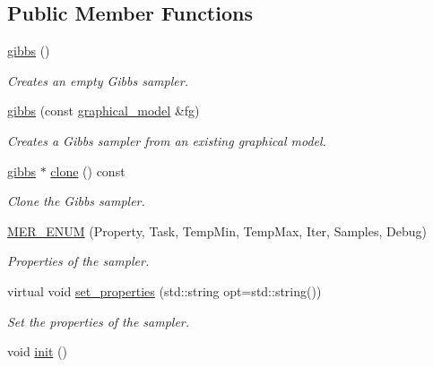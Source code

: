 \subsection*{Public Member Functions}
\begin{DoxyCompactItemize}
\item 
\hyperlink{classmerlin_1_1gibbs_a1513d2c6b58be4e4dd0e31c66d948e20}{gibbs} ()\hypertarget{classmerlin_1_1gibbs_a1513d2c6b58be4e4dd0e31c66d948e20}{}\label{classmerlin_1_1gibbs_a1513d2c6b58be4e4dd0e31c66d948e20}

\begin{DoxyCompactList}\small\item\em Creates an empty Gibbs sampler. \end{DoxyCompactList}\item 
\hyperlink{classmerlin_1_1gibbs_accbce95053cf0e18167d863ca9d3b832}{gibbs} (const \hyperlink{classmerlin_1_1graphical__model}{graphical\+\_\+model} \&fg)\hypertarget{classmerlin_1_1gibbs_accbce95053cf0e18167d863ca9d3b832}{}\label{classmerlin_1_1gibbs_accbce95053cf0e18167d863ca9d3b832}

\begin{DoxyCompactList}\small\item\em Creates a Gibbs sampler from an existing graphical model. \end{DoxyCompactList}\item 
\hyperlink{classmerlin_1_1gibbs}{gibbs} $\ast$ \hyperlink{classmerlin_1_1gibbs_a3479cca656a53a22c32ecdaa1a010308}{clone} () const 
\begin{DoxyCompactList}\small\item\em Clone the Gibbs sampler. \end{DoxyCompactList}\item 
\hyperlink{classmerlin_1_1gibbs_a323edb9ecc0c7c69ca872ec92f5d727c}{M\+E\+R\+\_\+\+E\+N\+UM} (Property, Task, Temp\+Min, Temp\+Max, Iter, Samples, Debug)\hypertarget{classmerlin_1_1gibbs_a323edb9ecc0c7c69ca872ec92f5d727c}{}\label{classmerlin_1_1gibbs_a323edb9ecc0c7c69ca872ec92f5d727c}

\begin{DoxyCompactList}\small\item\em Properties of the sampler. \end{DoxyCompactList}\item 
virtual void \hyperlink{classmerlin_1_1gibbs_ab3981d10b8a378c2979a1dbb58893df1}{set\+\_\+properties} (std\+::string opt=std\+::string())
\begin{DoxyCompactList}\small\item\em Set the properties of the sampler. \end{DoxyCompactList}\item 
void \hyperlink{classmerlin_1_1gibbs_ac14684f895fc27b59f318632a786acb7}{init} ()\hypertarget{classmerlin_1_1gibbs_ac14684f895fc27b59f318632a786acb7}{}\label{classmerlin_1_1gibbs_ac14684f895fc27b59f318632a786acb7}


\end{DoxyCompactItemize}
